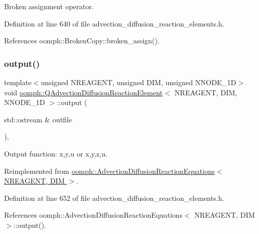 Broken assignment operator. 



Definition at line 640 of file advection\+\_\+diffusion\+\_\+reaction\+\_\+elements.\+h.



References oomph\+::\+Broken\+Copy\+::broken\+\_\+assign().

\mbox{\label{classoomph_1_1QAdvectionDiffusionReactionElement_abea67b1715ee4b70086ee68dcddbc0b1}} 
\subsubsection{\texorpdfstring{output()}{output()}\hspace{0.1cm}{\footnotesize\ttfamily [1/4]}}
{\footnotesize\ttfamily template$<$unsigned N\+R\+E\+A\+G\+E\+NT, unsigned D\+IM, unsigned N\+N\+O\+D\+E\+\_\+1D$>$ \\
void \hyperlink{classoomph_1_1QAdvectionDiffusionReactionElement}{oomph\+::\+Q\+Advection\+Diffusion\+Reaction\+Element}$<$ N\+R\+E\+A\+G\+E\+NT, D\+IM, N\+N\+O\+D\+E\+\_\+1D $>$\+::output (\begin{DoxyParamCaption}\item[{std\+::ostream \&}]{outfile }\end{DoxyParamCaption})\hspace{0.3cm}{\ttfamily [inline]}, {\ttfamily [virtual]}}



Output function\+: x,y,u or x,y,z,u. 



Reimplemented from \hyperlink{classoomph_1_1AdvectionDiffusionReactionEquations_a70be6733b56f27104a4a849c296b5b62}{oomph\+::\+Advection\+Diffusion\+Reaction\+Equations$<$ N\+R\+E\+A\+G\+E\+N\+T, D\+I\+M $>$}.



Definition at line 652 of file advection\+\_\+diffusion\+\_\+reaction\+\_\+elements.\+h.



References oomph\+::\+Advection\+Diffusion\+Reaction\+Equations$<$ N\+R\+E\+A\+G\+E\+N\+T, D\+I\+M $>$\+::output().

